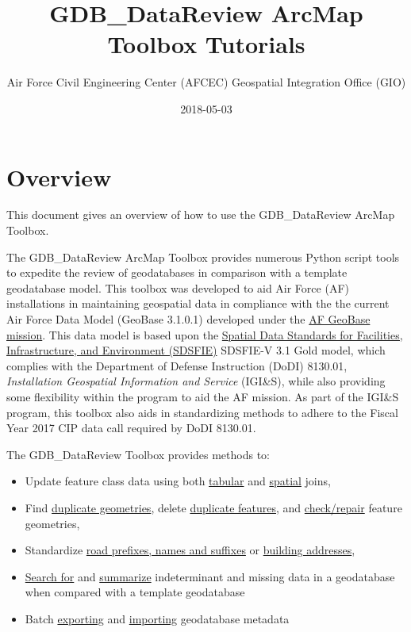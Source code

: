 \documentclass[openany]{book}
\title{GDB\_DataReview ArcMap Toolbox Tutorials}
\author{Air Force Civil Engineering Center (AFCEC) Geospatial Integration Office
(GIO)}
\date{2018-05-03}
\providecommand{\tightlist}{%
  \setlength{\itemsep}{0pt}\setlength{\parskip}{0pt}}
\theoremstyle{definition}
\theoremstyle{definition}
\theoremstyle{definition}
\theoremstyle{remark}
\begin{document}
\maketitle

{
\setcounter{tocdepth}{0}
\tableofcontents
}
\mainmatter

\chapter{Overview}\label{overview}

This document gives an overview of how to use the GDB\_DataReview ArcMap
Toolbox.

The GDB\_DataReview ArcMap Toolbox provides numerous Python script tools
to expedite the review of geodatabases in comparison with a template
geodatabase model. This toolbox was developed to aid Air Force (AF)
installations in maintaining geospatial data in compliance with the the
current Air Force Data Model (GeoBase 3.1.0.1) developed under the
\href{https://www.sdsfieonline.org/Components/USAF}{AF GeoBase mission}.
This data model is based upon the
\href{https://www.sdsfieonline.org/}{Spatial Data Standards for
Facilities, Infrastructure, and Environment (SDSFIE)} SDSFIE-V 3.1 Gold
model, which complies with the Department of Defense Instruction (DoDI)
8130.01, \emph{Installation Geospatial Information and Service}
(IGI\&S), while also providing some flexibility within the program to
aid the AF mission. As part of the IGI\&S program, this toolbox also
aids in standardizing methods to adhere to the Fiscal Year 2017 CIP data
call required by DoDI 8130.01.

The GDB\_DataReview Toolbox provides methods to:

\begin{itemize}
\tightlist
\item
  Update feature class data using both
  \protect\hyperlink{joinCalc}{tabular} and
  \protect\hyperlink{spatjoinCalc}{spatial} joins,
\item
  Find \protect\hyperlink{dupGeom}{duplicate geometries}, delete
  \protect\hyperlink{dupFeats}{duplicate features}, and
  \protect\hyperlink{chkGeom}{check/repair} feature geometries,
\item
  Standardize \protect\hyperlink{std3}{road prefixes, names and
  suffixes} or \protect\hyperlink{stdAdd1}{building addresses},
\item
  \protect\hyperlink{indtSearch}{Search for} and
  \protect\hyperlink{summIndt}{summarize} indeterminant and missing data
  in a geodatabase when compared with a template geodatabase
\item
  Batch \protect\hyperlink{exMeta}{exporting} and
  \protect\hyperlink{imMeta}{importing} geodatabase metadata
\end{itemize}
\end{document}
